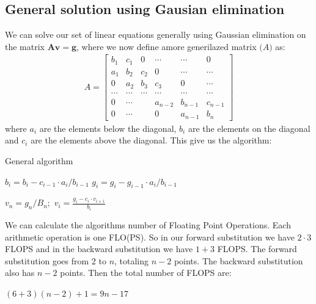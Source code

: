 \documentclass[american,a4paper,12pt]{article}
\renewcommand{\vec}[1]{\mathbf{#1}} %
\begin{document}
\subsection{General solution using Gausian elimination}
We can solve our set of linear equations generally using Gaussian elimination on the matrix $\vec{A}\vec{v} = \vec{g}$, where we now define amore generilazed matrix $\vec(A)$ as:
\begin{align*}
  A =
  \begin{bmatrix}
    b_1 & c_1 & 0 & \cdots & \cdots & 0 \\
    a_1 & b_2 & c_2 & 0 & \cdots & \cdots \\
    0 & a_2 & b_3 & c_3 & 0 & \cdots \\
    \cdots & \cdots & \cdots & \cdots & \cdots & \cdots \\
    0 & \cdots & & a_{n-2} & b_{n-1} & c_{n-1} \\
    0 & \cdots & & 0 & a_{n-1} & b_n
  \end{bmatrix}
\end{align*}
where $a_i$ are the elements below the diagonal, $b_i$ are the elements on the diagonal and $c_i$ are the elements above the diagonal. This give us the algorithm:
\begin{algorithm}
\caption{General algorithm}
\begin{algorithmic}[1] %
   
    \State $b_i = b_i - c_{i-1}\cdot {a_i}/{{b}_{i-1}}$ 
    \State $g_i = g_i - {g}_{i-1}\cdot {a_i}/{{b}_{i-1}}$ 
  \EndFor

  \Statex
  \State $v_n = g_n/B_n;$ 
    \State $v_i = \frac{g_i - c_i\cdot v_{i+1}}{b_i}$
  \EndFor
\end{algorithmic}
\end{algorithm}
We can calculate the algorithms number of Floating Point Operations. Each arithmetic operation is one FLO(PS). So in our forward substitution we have $2 \cdot 3$ FLOPS and in the backward substitution we have $1+3$ FLOPS. The forward substitution goes from $2$ to $n$, totaling $n-2$ points. The backward substitution also has $n-2$ points. Then the total number of FLOPS are:
\begin{center}
    $(6+3)(n-2)+1 = 9n-17$
\end{center}
\end{document}
